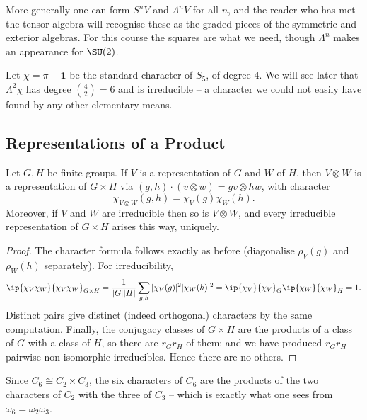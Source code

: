 \begin{remark}
	More generally one can form $S^nV$ and $\Lambda^nV$ for all $n$, and the reader who has met the tensor algebra will recognise these as the graded pieces of the symmetric and exterior algebras. For this course the squares are what we need, though $\Lambda^n$ makes an appearance for $\SU(2)$.
\end{remark}

\begin{example}
	Let $\chi = \pi - \mathbf 1$ be the standard character of $S_5$, of degree $4$. We will see later that $\Lambda^2\chi$ has degree $\binom42 = 6$ and is irreducible -- a character we could not easily have found by any other elementary means.
\end{example}

\subsection{Representations of a Product}

\begin{proposition}
	Let $G, H$ be finite groups. If $V$ is a representation of $G$ and $W$ of $H$, then $V\otimes W$ is a representation of $G\times H$ via $(g,h)\cdot(v\otimes w) = gv\otimes hw$, with character
	$$\chi_{V\otimes W}(g,h) = \chi_V(g)\chi_W(h).$$
	Moreover, if $V$ and $W$ are irreducible then so is $V\otimes W$, and every irreducible representation of $G\times H$ arises this way, uniquely.
\end{proposition}
\begin{proof}
	The character formula follows exactly as before (diagonalise $\rho_V(g)$ and $\rho_W(h)$ separately). For irreducibility,
	$$\ip{\chi_V\chi_W}{\chi_V\chi_W}_{G\times H} = \frac1{|G||H|}\sum_{g,h}|\chi_V(g)|^2|\chi_W(h)|^2 = \ip{\chi_V}{\chi_V}_G\ip{\chi_W}{\chi_W}_H = 1.$$
	Distinct pairs give distinct (indeed orthogonal) characters by the same computation. Finally, the conjugacy classes of $G\times H$ are the products of a class of $G$ with a class of $H$, so there are $r_Gr_H$ of them; and we have produced $r_Gr_H$ pairwise non-isomorphic irreducibles. Hence there are no others.
\end{proof}

\begin{example}
	Since $C_6 \cong C_2\times C_3$, the six characters of $C_6$ are the products of the two characters of $C_2$ with the three of $C_3$ -- which is exactly what one sees from $\omega_6 = \omega_2\omega_3$.
\end{example}

